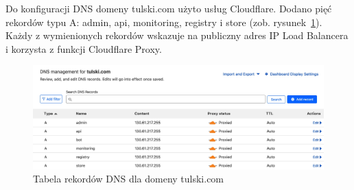 Do konfiguracji DNS domeny tulski.com użyto usług Cloudflare.
Dodano pięć rekordów typu A: admin, api, monitoring, registry i store (zob. rysunek~\ref{fig:dns-tulski-com}).
Każdy z wymienionych rekordów wskazuje na publiczny adres IP Load Balancera i korzysta z funkcji Cloudflare Proxy.

\begin{figure}[H]
    \centering
    \includegraphics[width=\textwidth]{img/dns-tulski-com}
    \caption{Tabela rekordów DNS dla domeny tulski.com}
    \label{fig:dns-tulski-com}
\end{figure}

%
%

%

